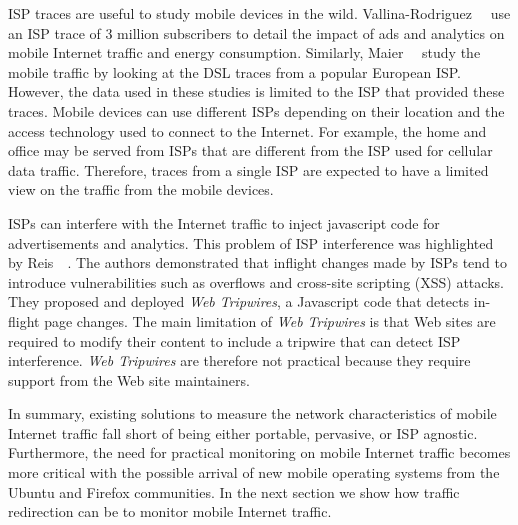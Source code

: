ISP traces are useful to study mobile devices in the wild. 
Vallina-Rodriguez~\etal~\cite{vallina-rod:ads} use an ISP trace of 3 million subscribers to detail the impact of ads and analytics on mobile Internet traffic and energy consumption. 
Similarly, Maier~\etal~\cite{maier:mobtraffic} study the mobile traffic by looking at the DSL traces from a popular European ISP. 
However, the data used in these studies is limited to the ISP that provided these traces.
Mobile devices can use different ISPs depending on their location and the access technology used to connect to the Internet. 
For example, the home \wifi and office \wifi may be served from ISPs that are different from the ISP used for cellular data traffic.
Therefore, traces from a single ISP are expected to have a limited view on the traffic from the mobile devices.

ISPs can interfere with the Internet traffic to inject javascript code for advertisements and analytics.
This problem of ISP interference was highlighted by Reis~\etal~\cite{reis:tripwires}. 
The authors demonstrated that inflight changes made by ISPs tend to introduce vulnerabilities such as overflows and cross-site scripting (XSS) attacks. 
They proposed and deployed \emph{Web Tripwires}, a Javascript code that detects in-flight page changes. 
The main limitation of \emph{Web Tripwires} is that Web sites are required to modify their content to include a tripwire that can detect ISP interference. 
\emph{Web Tripwires} are therefore not practical because they require support from the Web site maintainers.

In summary, existing solutions to measure the network characteristics of mobile Internet traffic fall short of being either portable, pervasive, or ISP agnostic. 
Furthermore, the need for practical monitoring on mobile Internet traffic becomes more critical with the possible arrival of new mobile operating systems from the Ubuntu and Firefox communities.
In the next section we show how traffic redirection can be to monitor mobile Internet traffic. 


